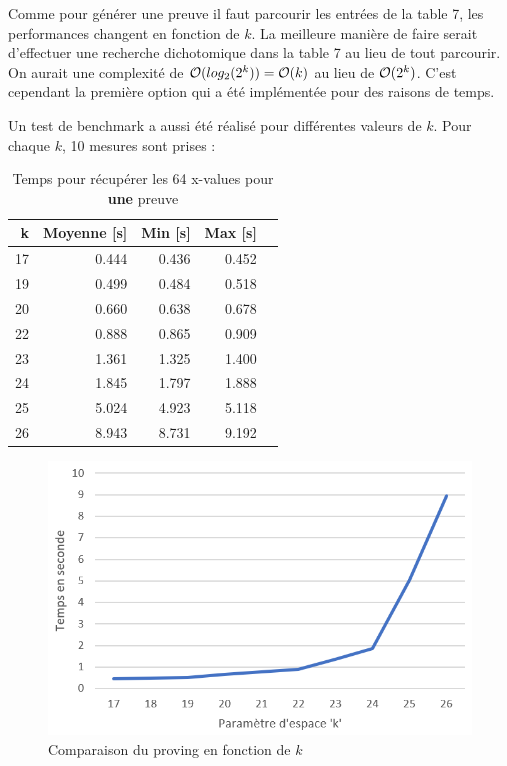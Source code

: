 Comme pour générer une preuve il faut parcourir les entrées de la table 7, les performances changent en fonction de $k$. La meilleure manière de faire serait d'effectuer une recherche dichotomique dans la table 7 au lieu de tout parcourir. On aurait une complexité de $\mathcal{O}(log_2(2^k)) = \mathcal{O}(k)$ au lieu de $\mathcal{O}(2^k)$. C'est cependant la première option qui a été implémentée pour des raisons de temps.

Un test de benchmark a aussi été réalisé pour différentes valeurs de $k$. Pour chaque $k$, 10 mesures sont prises :

\begin{table}[H]
  \centering
  \begin{tabular}{rrrrr}
    \textbf{k} & \textbf{Moyenne [s]} & \textbf{Min [s]} & \textbf{Max [s]} \\
    \hline
    \hline
    17 & 0.444 & 0.436 & 0.452 \\
    \hline
    19 & 0.499 & 0.484 & 0.518 \\
    \hline
    20 & 0.660 & 0.638 & 0.678 \\
    \hline
    22 & 0.888 & 0.865 & 0.909 \\
    \hline
    23 & 1.361  & 1.325  & 1.400    \\
    \hline
    24 & 1.845  & 1.797  & 1.888  \\
    \hline
    25 & 5.024  & 4.923  & 5.118  \\
    \hline
    26 & 8.943  & 8.731  & 9.192 
  \end{tabular}
  \caption{Temps pour récupérer les 64 x-values pour \textbf{une} preuve}
\end{table}

\begin{figure}[H]
  \centering
  \includegraphics[width=12cm]{images/bench_proving.png}
  \caption{Comparaison du proving en fonction de $k$}
\end{figure}

